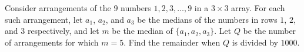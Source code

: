 Consider arrangements of the $9$ numbers $1, 2, 3, \dots, 9$ in a $3 \times 3$ array. For each such arrangement, let $a_1$, $a_2$, and $a_3$ be the medians of the numbers in rows $1$, $2$, and $3$ respectively, and let $m$ be the median of $\{a_1, a_2, a_3\}$. Let $Q$ be the number of arrangements for which $m = 5$. Find the remainder when $Q$ is divided by $1000$.